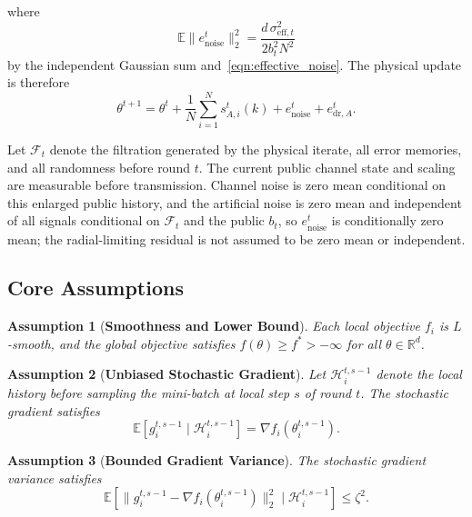 \documentclass[journal]{IEEEtran}
\newtheorem{assumption}{Assumption}
\begin{document}
where
\begin{equation}
    \mathbb E\|e_{\mathrm{noise}}^t\|_2^2
    =\frac{d\,\sigma_{\mathrm{eff},t}^2}{2b_t^2N^2}
\end{equation}
by the independent Gaussian sum and~\eqref{eqn:effective_noise}.
The physical update is therefore
\begin{equation}
    \label{eqn:physical_update_dr}
    \theta^{t+1}
    =\theta^t+\frac1N\sum_{i=1}^{N}s_{A,i}^t(k)
    +e_{\mathrm{noise}}^t+e_{\mathrm{dr},A}^t.
\end{equation}

Let $\mathcal F_t$ denote the filtration generated by the physical iterate, all error memories, and all randomness before round $t$. The current public channel state and scaling are measurable before transmission. Channel noise is zero mean conditional on this enlarged public history, and the artificial noise is zero mean and independent of all signals conditional on $\mathcal F_t$ and the public $b_t$, so $e_{\mathrm{noise}}^t$ is conditionally zero mean; the radial-limiting residual is not assumed to be zero mean or independent.

\subsection{Core Assumptions}

\begin{assumption}[\bf Smoothness and Lower Bound]
    \label{assum:smoothness}
    Each local objective $f_i$ is $L$-smooth, and the global objective satisfies $f(\theta)\ge f^*>-\infty$ for all $\theta\in\mathbb{R}^d$.
\end{assumption}

\begin{assumption}[\bf Unbiased Stochastic Gradient]
    \label{assum:unbiased}
    Let $\mathcal{H}_{i}^{t,s-1}$ denote the local history before sampling the mini-batch at local step $s$ of round $t$. The stochastic gradient satisfies
    \begin{equation}
        \mathbb{E}\left[g_i^{t,s-1}\mid\mathcal{H}_{i}^{t,s-1}\right]
        =\nabla f_i(\theta_i^{t,s-1}).
    \end{equation}
\end{assumption}

\begin{assumption}[\bf Bounded Gradient Variance]
    \label{assum:variance}
    The stochastic gradient variance satisfies
    \begin{equation}
        \mathbb{E}\left[
        \|g_i^{t,s-1}-\nabla f_i(\theta_i^{t,s-1})\|_2^2
        \mid\mathcal{H}_{i}^{t,s-1}
        \right]\le \zeta^2.
    \end{equation}
\end{assumption}
\end{document}
